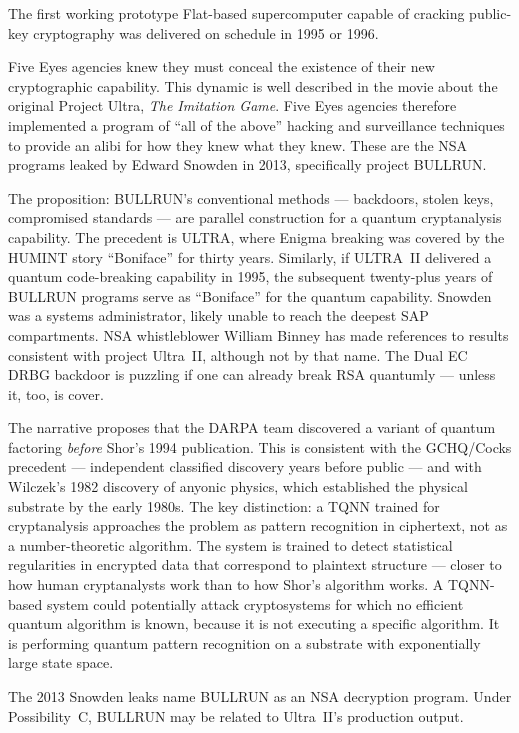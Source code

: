 The first working prototype Flat-based supercomputer capable of cracking public-key cryptography was delivered on schedule in 1995 or 1996.

Five Eyes agencies knew they must conceal the existence of their new cryptographic capability. This dynamic is well described in the movie about the original Project Ultra, \textit{The Imitation Game}. Five Eyes agencies therefore implemented a program of ``all of the above'' hacking and surveillance techniques to provide an alibi for how they knew what they knew. These are the NSA programs leaked by Edward Snowden in 2013, specifically project BULLRUN\@.

The proposition: BULLRUN's conventional methods --- backdoors, stolen keys, compromised standards --- are parallel construction for a quantum cryptanalysis capability. The precedent is ULTRA, where Enigma breaking was covered by the HUMINT story ``Boniface'' for thirty years. Similarly, if ULTRA~II delivered a quantum code-breaking capability in 1995, the subsequent twenty-plus years of BULLRUN programs serve as ``Boniface'' for the quantum capability. Snowden was a systems administrator, likely unable to reach the deepest SAP compartments. NSA whistleblower William Binney has made references to results consistent with project Ultra~II, although not by that name. The Dual EC DRBG backdoor is puzzling if one can already break RSA quantumly --- unless it, too, is cover.

The narrative proposes that the DARPA team discovered a variant of quantum factoring \textit{before} Shor's 1994 publication. This is consistent with the GCHQ/Cocks precedent --- independent classified discovery years before public --- and with Wilczek's 1982 discovery of anyonic physics, which established the physical substrate by the early 1980s. The key distinction: a TQNN trained for cryptanalysis approaches the problem as pattern recognition in ciphertext, not as a number-theoretic algorithm. The system is trained to detect statistical regularities in encrypted data that correspond to plaintext structure --- closer to how human cryptanalysts work than to how Shor's algorithm works. A TQNN-based system could potentially attack cryptosystems for which no efficient quantum algorithm is known, because it is not executing a specific algorithm. It is performing quantum pattern recognition on a substrate with exponentially large state space.

The 2013 Snowden leaks name BULLRUN as an NSA decryption program. Under Possibility~C, BULLRUN may be related to Ultra~II's production output.

